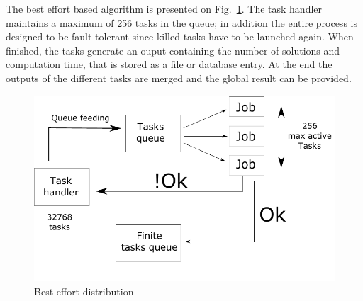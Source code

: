 The best effort based algorithm is presented on Fig.~\ref{fig:graphe_besteffort}.
The task handler maintains a maximum of 256 tasks in the queue; in addition the entire process is designed to be fault-tolerant since killed tasks have to be launched again.
When finished, the tasks generate an ouput containing the number of solutions and computation time, that is stored as a file or database entry. 
At the end the outputs of the different tasks are merged and the global result can be provided.  

\begin{figure}[htbp]
\centering
\includegraphics[scale=.6]{figures/langford/best_effort}
\caption{Best-effort distribution}
\label{fig:graphe_besteffort}
\end{figure}

%



